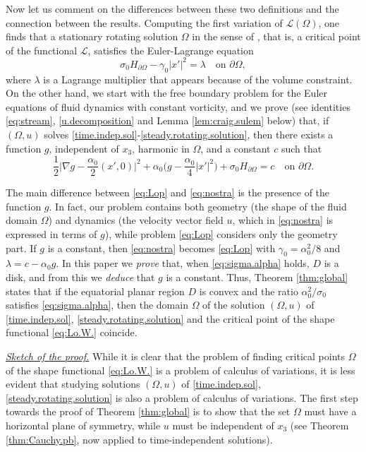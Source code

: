 \documentclass[10pt,reqno,a4paper]{article}
\numberwithin{equation}{section}
\theoremstyle{plain}
\theoremstyle{definition}
\newcommand{\mL}{\mathcal{L}}
\renewcommand{\a}{\alpha}
\newcommand{\lm}{\lambda}
\newcommand{\Om}{\Omega}
\newcommand{\pa}{\partial}
\begin{document}
Now let us comment on the differences between these two definitions 
and the connection between the results. 
Computing the first variation of $\mathcal L(\Omega)$, 
one finds that a stationary rotating solution $\Omega$ in the sense of \cite{Lo,W}, %
that is, a critical point of the functional $\mL$, satisfies the Euler-Lagrange equation
\begin{equation}\label{eq:Lop}
\sigma_0 H_{\pa \Omega} - \gamma_0 |x'|^2 = \lambda  \quad \text{on } \pa \Omega,
\end{equation}
where $\lambda$ is a Lagrange multiplier that appears because of the volume constraint.
On the other hand, we start with the free boundary problem 
for the Euler equations of fluid dynamics with constant vorticity, 
and we prove (see identities \eqref{eq:stream}, \eqref{u.decomposition} 
and Lemma \ref{lem:craig.sulem} below) 
that, if $(\Om,u)$ solves \eqref{time.indep.sol}-\eqref{steady.rotating.solution}, then 
there exists a function $g$, independent of $x_3$, harmonic in $\Om$, 
and a constant $c$ such that 
\begin{equation}\label{eq:nostra}
\frac12 \Big| \nabla g - \frac{\alpha_0}{2} (x', 0) \Big|^2 
+ \alpha_0 \Big(g-\frac{\alpha_0}{4}|x'|^2\Big)  
+ \sigma_0 H_{\pa \Om} = c \quad  \text{on }  \pa \Omega.
\end{equation}

The main difference between \eqref{eq:Lop} and \eqref{eq:nostra} 
is the presence of the function $g$.  
In fact, our problem contains both geometry (the shape of the fluid domain $\Omega$) 
and dynamics (the velocity vector field $u$, which in \eqref{eq:nostra} is expressed in terms of $g$), 
while problem \eqref{eq:Lop} considers only the geometry part. 
If $g$ is a constant, then \eqref{eq:nostra} becomes \eqref{eq:Lop} 
with $\gamma_0 = \a_0^2/8$ and $\lm = c - \alpha_0 g$. 
In this paper we \emph{prove} that, when \eqref{eq:sigma.alpha} holds, 
$D$ is a disk, and from this we \emph{deduce} that $g$ is a constant. 
Thus, Theorem \ref{thm:global} states that if the equatorial planar region $D$ is convex 
and the ratio $\a_0^2 / \sigma_0$ satisfies \eqref{eq:sigma.alpha}, 
then the domain $\Om$ of the solution $(\Om, u)$ 
of \eqref{time.indep.sol}, \eqref{steady.rotating.solution}
and the critical point of the shape functional \eqref{eq:Lo.W.} coincide. 


\medskip

\underline{{\it Sketch of the proof.}}
While it is clear that the problem of finding critical points $\Om$ of the shape functional \eqref{eq:Lo.W.} 
is a problem of calculus of variations,
it is less evident that studying solutions $(\Om,u)$ 
of \eqref{time.indep.sol}, \eqref{steady.rotating.solution}
is also a problem of calculus of variations. 
The first step towards the proof of Theorem \ref{thm:global} 
is to show that the set $\Omega$ must have a horizontal plane of symmetry, 
while $u$ must be independent of $x_3$ 
(see Theorem \ref{thm:Cauchy.pb}, now applied to time-independent solutions). 
\end{document}
